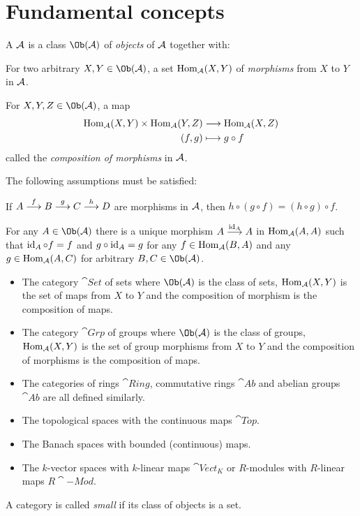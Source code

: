 \documentclass[a4paper,parskip=half,numbers=enddot, DIV=12]{scrreprt}
\begin{document}
\section{Fundamental concepts}
\begin{defi}[Category]
	A  $\mathcal{A}$ is a class $\Ob(\Aa)$ of \emph{objects} of $\mathcal{A}$ together with:
	\begin{alphanumerate}
	    \item 
	        For two arbitrary $X,Y\in \Ob(\Aa)$, a set $\operatorname{Hom}_{\mathcal{A}}(X,Y)$ of \emph{morphisms} from $X$ to $Y$ in $\mathcal{A}$.
	    \item 
	        For $X,Y,Z\in\Ob(\Aa)$, a map 
	        \begin{align*}
	            \operatorname{Hom}_{\mathcal{A}}(X,Y)\times \operatorname{Hom}_{\mathcal{A}}(Y,Z) &\longrightarrow \operatorname{Hom}_{\mathcal{A}}(X,Z)\\
	            (f,g) &\longmapsto g\circ f
	        \end{align*}
	        called the \emph{composition of morphisms} in $\mathcal{A}$.
	\end{alphanumerate}
	The following assumptions must be satisfied:
	\begin{rmnumerate}
	    \item
	        If $A\morphism[f] B \morphism[g] C\morphism[h] D$ are morphisms in $\mathcal{A}$, then $h\circ(g\circ f) = (h\circ g)\circ f$.
	    \item
	        For any $A\in\Ob(\Aa)$ there is a unique morphism $A\morphism[\id_A] A$ in $\operatorname{Hom}_{\mathcal{A}}(A,A)$ such that $\operatorname{id}_A \circ f = f$ and $g\circ \operatorname{id}_A = g$ for any $f\in \operatorname{Hom}_{\mathcal{A}}(B,A)$ and any $g\in \operatorname{Hom}_{\mathcal{A}}(A,C)$ for arbitrary $B,C\in \Ob(\Aa)$.
	\end{rmnumerate}
\end{defi}
\begin{example}
    \begin{itemize}
        \item 
            The category $\cat{Set}$ of sets where $\Ob(\Aa)$ is the class of sets, $\operatorname{Hom}_{\mathcal{A}}(X,Y)$ is the set of maps from $X$ to $Y$ and the composition of morphism is the composition of maps.
        \item 
            The category $\cat{Grp}$ of groups where $\Ob(\Aa)$ is the class of groups, $\operatorname{Hom}_{\mathcal{A}}(X,Y)$ is the set of group morphisms from $X$ to $Y$ and the composition of morphisms is the composition of maps.
        \item 
            The categories of rings $\cat{Ring}$, commutative rings $\cat{Ab}$ and abelian groups $\cat{Ab}$ are all defined similarly.
        \item 
            The topological spaces with the continuous maps $\cat{Top}$.
        \item 
            The Banach spaces with bounded (continuous) maps.
        \item 
            The $k$-vector spaces with $k$-linear maps $\cat{Vect}_K$ or $R$-modules with $R$-linear maps $R\cat{-Mod}$.
    \end{itemize}
\end{example}
A category is called \emph{small} if its class of objects is a set.
\end{document}
